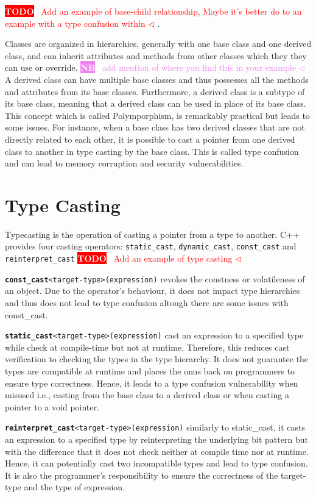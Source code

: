 \documentclass[a4paper,11pt,oneside]{report}
\newcommand{\todobox}[3]{%
       \colorbox{#1}{\textcolor{white}{\sffamily\bfseries\scriptsize #2}}%
       ~\textcolor{#1}{#3} %
       \textcolor{#1}{$\triangleleft$}%
}
\newcommand{\nb}[1]{\todobox{violet}{NB}{#1}}
\newcommand{\adrbqt}[1]{\todobox{red}{TODO}{#1}}
\begin{document}
\adrbqt{Add an example of base-child relationship, Maybe it's better do to an example with a type confusion within}.

Classes are organized in hierarchies, generally with one base class and one derived class, and can inherit attributes and methods from other classes which they
they can use or override. \nb{add mention of where you find this in your example}A derived class can have multiple base classes and thus possesses all the methods and attributes from its base classes. 
Furthermore, a derived class is a subtype of its base class, meaning that a derived class can be used in place of its base class. This concept which is called 
Polymporphism, is remarkably practical but leads to some issues. For instance, when a base class has two derived classes that are not directly related to each other, 
it is possible to cast a pointer from one derived class to another in type casting by the base class.
This is called type confusion and can lead to memory corruption and security vulnerabilities.

\section{Type Casting}
Typecasting is the operation of casting a pointer from a type to another. C++ provides four casting operators: \texttt{static\_cast}, \texttt{dynamic\_cast}, 
\texttt{const\_cast} and \texttt{reinterpret\_cast}
\adrbqt{Add an example of type casting}

\texttt{\textbf{const\_cast}<target-type>(expression)} revokes the constness or volatileness of an object. Due to the operator's behaviour, it does not impact type hierarchies and 
thus does not lead to type confusion altough there are some issues with const\_cast.

\texttt{\textbf{static\_cast}<target-type>(expression)} cast an expression to a specified type while check at compile-time but not at runtime. Therefore, this reduces cast verification to checking the types 
in the type hierarchy. It does not guarantee the types are compatible at runtime and places the onus back on programmers to ensure type correctness. Hence, it leads to a type confusion vulnerability when misused i.e.,
casting from the base class to a derived class or when casting a pointer to a void pointer.

\texttt{\textbf{reinterpret\_cast}<target-type>(expression)} similarly to static\_cast, it casts an expression to a specified type by reinterpreting the underlying bit pattern but with the difference 
that it does not check neither at compile time nor at runtime. Hence, it can potentially cast two incompatible types and lead to type confusion. 
It is also the programmer's responsibility to ensure the correctness of the target-type and the type of expression.
\end{document}
